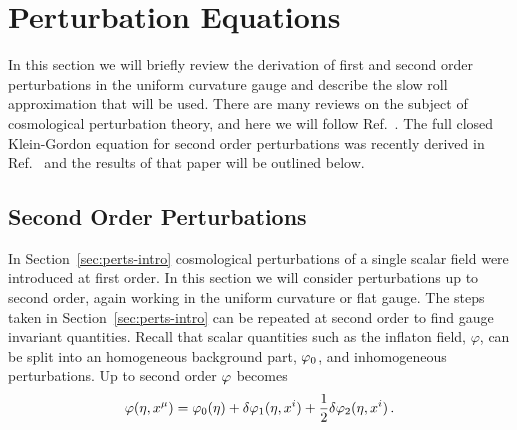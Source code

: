\section{Perturbation Equations}
\label{sec:perts-num}


In this section we will briefly review the derivation of first and
second order perturbations in the uniform curvature gauge and describe
the slow roll approximation that will be used. There are
many reviews on the subject of cosmological perturbation theory, and
here we will follow Ref.~\cite{Malik:2008im}.  The full closed
Klein-Gordon equation for second order perturbations was recently
derived in Ref.~\cite{Malik:2006ir} and the results of that paper will be
outlined below.

\subsection{Second Order Perturbations}
\label{sec:fosoperts-num}
In Section~\ref{sec:perts-intro} cosmological perturbations of a single scalar field
were introduced at first order. In this section we will consider perturbations up to
second order, again working in the uniform curvature or flat
gauge. 
The steps taken in Section~\ref{sec:perts-intro} can be repeated at second order to
find gauge invariant quantities. Recall that scalar quantities such as the inflaton
field, $\varphi$, can be split into an homogeneous background part, $\varphi_0$, and
inhomogeneous perturbations. Up to second order $\varphi$ becomes
%  
\begin{equation}
 \varphi(\eta, x^\mu) = \varphi_0(\eta) + \delta\varphi_{1}(\eta, x^i) + \frac{1}{2}\delta\varphi_{2}(\eta, x^i)
\,.
\end{equation}

